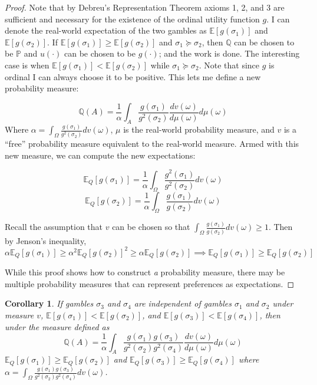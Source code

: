 \documentclass{article}
\newtheorem{corollary}{Corollary}
\begin{document}
\begin{proof}
Note that by Debreu's Representation Theorem axioms 1, 2, and 3 are sufficient and necessary for the existence of the ordinal utility function \(g\).  I can denote the real-world expectation of the two gambles as \(\mathbb{E}[g(\sigma_1)]\) and \(\mathbb{E}[g(\sigma_2)]\). If \(\mathbb{E}[g(\sigma_1)]\geq\mathbb{E}[g(\sigma_2)]\) and \(\sigma_1 \succeq \sigma_2\), then \(\mathbb{Q}\) can be chosen to be \(\mathbb{P}\) and \(u(\cdot)\) can be chosen to be \(g(\cdot)\); and the work is done.  The interesting case is when \(\mathbb{E}[g(\sigma_1)]<\mathbb{E}[g(\sigma_2)]\) while \(\sigma_1 \succeq \sigma_2\).  Note that since \(g\) is ordinal I can always choose it to be positive.  This lets me define a new probability measure:

\[\mathbb{Q}(A)=\frac{1}{\alpha}\int_A \frac{g(\sigma_1)}{g^2(\sigma_2)} \frac{dv(\omega) }{ d\mu(\omega)} d\mu(\omega)\] 
Where \(\alpha=\int_\Omega \frac{g(\sigma_1)}{g^2(\sigma_2)} dv(\omega) \), \(\mu\) is the real-world probability measure, and \(v\) is a ``free'' probability measure equivalent to the real-world measure.  Armed with this new measure, we can compute the new expectations:

\[\mathbb{E}_Q[g(\sigma_1)]=\frac{1}{\alpha} \int_\Omega \frac{g^2(\sigma_1)}{g^2(\sigma_2)} dv(\omega)\]
\[\mathbb{E}_Q[g(\sigma_2)]=\frac{1}{\alpha} \int_\Omega \frac{g(\sigma_1)}{g(\sigma_2)} dv(\omega)\]

Recall the assumption that \(v\) can be chosen so that \(\int_\Omega \frac{g(\sigma_1)}{g(\sigma_2)} dv(\omega)\geq 1\).  Then by Jenson's inequality, 
\[\alpha \mathbb{E}_Q[g(\sigma_1)] \geq   \alpha^2 \mathbb{E}_Q[g(\sigma_2)]^2 \geq  \alpha \mathbb{E}_Q[g(\sigma_2)] \implies \mathbb{E}_Q[g(\sigma_1)] \geq \mathbb{E}_Q[g(\sigma_2)] \]

While this proof shows how to construct \emph{a} probability measure, there may be multiple probability measures that can represent preferences as expectations. 

\end{proof}

\begin{corollary}\label{corr1}
	If gambles \(\sigma_3\) and \(\sigma_4\) are independent of gambles \(\sigma_1\) and \(\sigma_2\) under measure \(v\), \(\mathbb{E}[g(\sigma_1)] < \mathbb{E}[g(\sigma_2)]\), and \(\mathbb{E}[g(\sigma_3)] < \mathbb{E}[g(\sigma_4)]\), then under the measure defined as 
	\[\mathbb{Q}(A)=\frac{1}{\alpha}\int_A \frac{g(\sigma_1)g(\sigma_3)}{g^2(\sigma_2)g^2(\sigma_4)} \frac{dv(\omega) }{ d\mu(\omega)} d\mu(\omega)\]
	\(\mathbb{E}_Q[g(\sigma_1)]\geq\mathbb{E}_Q[g(\sigma_2)]\) and \(\mathbb{E}_Q[g(\sigma_3)]\geq\mathbb{E}_Q[g(\sigma_4)]\) where \(\alpha=\int_\Omega \frac{g(\sigma_1)g(\sigma_3)}{g^2(\sigma_2)g^2(\sigma_4)} dv(\omega) \).
\end{corollary}
\end{document}
